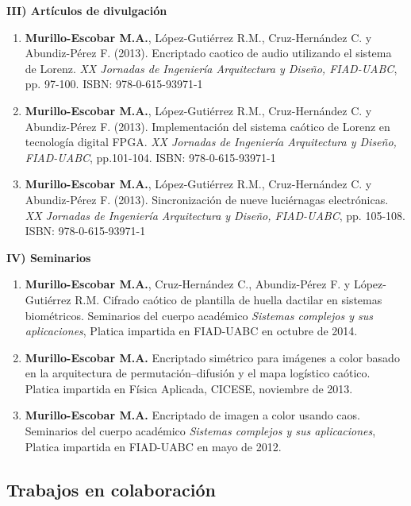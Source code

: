 \textbf{III) Artículos de divulgación}
\begin{enumerate}
\item \textbf{Murillo-Escobar M.A.}, López-Gutiérrez R.M., Cruz-Hernández C. y Abundiz-Pérez F. (2013). Encriptado caotico de audio utilizando el sistema de Lorenz. \textit{XX Jornadas de Ingeniería Arquitectura y Diseño, FIAD-UABC}, pp. 97-100. ISBN: 978-0-615-93971-1

\item \textbf{Murillo-Escobar M.A.}, López-Gutiérrez R.M., Cruz-Hernández C. y Abundiz-Pérez F. (2013). Implementación del sistema caótico de Lorenz en tecnología digital FPGA. \textit{XX Jornadas de Ingeniería Arquitectura y Diseño, FIAD-UABC}, pp.101-104. ISBN: 978-0-615-93971-1

\item \textbf{Murillo-Escobar M.A.}, López-Gutiérrez R.M., Cruz-Hernández C. y Abundiz-Pérez F. (2013). Sincronización de nueve luciérnagas electrónicas. \textit{XX Jornadas de Ingeniería Arquitectura y Diseño, FIAD-UABC}, pp. 105-108. ISBN: 978-0-615-93971-1 \\
\end{enumerate}

\textbf{IV) Seminarios}

\begin{enumerate}
\item \textbf{Murillo-Escobar M.A.}, Cruz-Hernández C., Abundiz-Pérez F. y López-Gutiérrez R.M. Cifrado caótico de plantilla de huella dactilar en sistemas biométricos. Seminarios del cuerpo académico \textit{Sistemas complejos y sus aplicaciones}, Platica impartida en FIAD-UABC en octubre de 2014. 

\item \textbf{Murillo-Escobar M.A.} Encriptado simétrico para imágenes a color basado en la arquitectura de permutación–difusión y el mapa logístico caótico. Platica impartida en Física Aplicada, CICESE, noviembre de 2013.

\item \textbf{Murillo-Escobar M.A.} Encriptado de imagen a color usando caos. Seminarios del cuerpo académico \textit{Sistemas complejos y sus aplicaciones}, Platica impartida en FIAD-UABC en mayo de 2012. 
\end{enumerate}

\subsection{Trabajos en colaboración}

